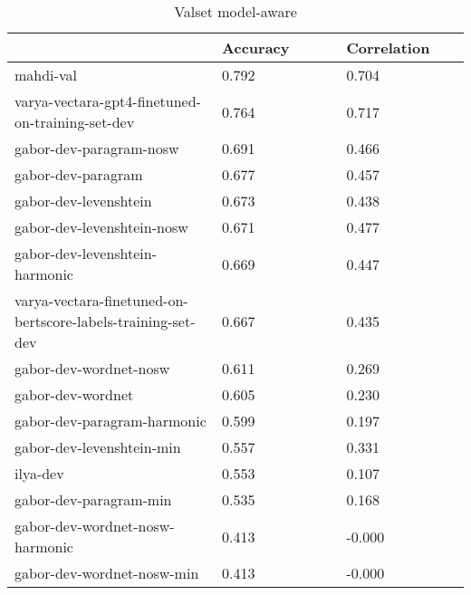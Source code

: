 \begin{table}
\centering
\caption{Valset model-aware}
\label{val-aware}
\begin{tabular}{|p{0.45\linewidth}|R{0.275\linewidth}|R{0.275\linewidth}|}
\hline
 & Accuracy & Correlation \\
\hline
mahdi-val & 0.792 & 0.704 \\
varya-vectara-gpt4-finetuned-on-training-set-dev & 0.764 & 0.717 \\
gabor-dev-paragram-nosw & 0.691 & 0.466 \\
gabor-dev-paragram & 0.677 & 0.457 \\
gabor-dev-levenshtein & 0.673 & 0.438 \\
gabor-dev-levenshtein-nosw & 0.671 & 0.477 \\
gabor-dev-levenshtein-harmonic & 0.669 & 0.447 \\
varya-vectara-finetuned-on-bertscore-labels-training-set-dev & 0.667 & 0.435 \\
gabor-dev-wordnet-nosw & 0.611 & 0.269 \\
gabor-dev-wordnet & 0.605 & 0.230 \\
gabor-dev-paragram-harmonic & 0.599 & 0.197 \\
gabor-dev-levenshtein-min & 0.557 & 0.331 \\
ilya-dev & 0.553 & 0.107 \\
gabor-dev-paragram-min & 0.535 & 0.168 \\
gabor-dev-wordnet-nosw-harmonic & 0.413 & -0.000 \\
gabor-dev-wordnet-nosw-min & 0.413 & -0.000 \\
\hline
\end{tabular}
\end{table}
